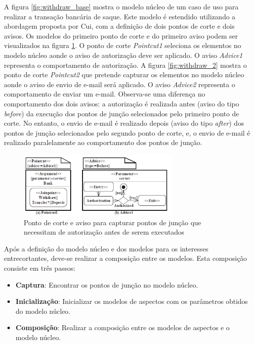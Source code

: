  A figura \ref{fig:withdraw_base} mostra o modelo núcleo de um caso de uso para realizar a transação bancária de saque. Este modelo é estendido
 utilizando a abordagem proposta por Cui, com a definição de dois pontos de corte e dois avisos. Os modelos do primeiro ponto de corte e do
 primeiro aviso podem ser visualizados na figura \ref{fig:withdraw_1}. O ponto de corte \textit{Pointcut1} seleciona os elementos no modelo núcleo
 aonde o aviso de autorização deve ser aplicado. O aviso \textit{Advice1} representa o comportamento de autorização. A figura \ref{fig:withdraw_2}
 mostra o ponto de corte \textit{Pointcut2} que pretende capturar os elementos no modelo núcleo aonde o aviso de envio de e-mail será
 aplicado. O aviso \textit{Advice2} representa o comportamento de enviar um e-mail. Observa-se uma diferença no comportamento dos dois avisos: a
 autorização é realizada antes (aviso do tipo \textit{before}) da execução dos pontos de junção selecionados pelo primeiro ponto de corte. No entanto,
 o envio de e-mail é realizado depois (aviso do tipo \textit{after}) dos pontos de junção selecionados pelo segundo ponto de corte, e, o envio de
 e-mail é realizado paralelamente ao comportamento dos pontos de junção. 

\begin{figure}
	\centering
	\includegraphics[width=300px]{img/withdraw_1.png}
	\caption{Ponto de corte e aviso para capturar pontos
	de junção que necessitam de autorização antes de
	serem executados}\label{fig:withdraw_1}
\end{figure}

Após a definição do modelo núcleo e dos modelos para os interesses entrecortantes, deve-se realizar a composição entre os modelos. Esta composição
consiste em três passos:

\begin{itemize}
  \item \textbf{Captura}: Encontrar os pontos de junção no modelo núcleo.
  \item \textbf{Inicialização}: Inicializar os modelos de aspectos com os parâmetros obtidos do modelo núcleo.
  \item \textbf{Composição}: Realizar a composição entre os modelos de aspectos e o modelo núcleo.
\end{itemize}

